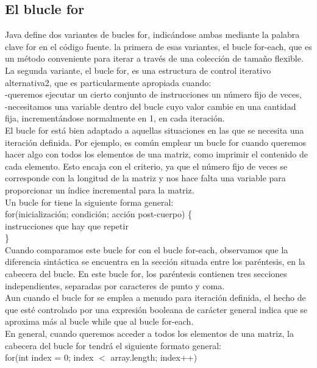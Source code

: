 \documentclass[11pt,a4paper]{article}
\begin{document}
\subsection{El blucle for}
Java define dos variantes de bucles for, indicándose ambas mediante la palabra clave for en el
código fuente.
la primera de esas variantes, el bucle for-each,
que es un método conveniente para iterar a través de una colección de tamaño flexible. La segunda
variante, el bucle for, es una estructura de control iterativo alternativa2, que es particularmente
apropiada cuando:\\
-queremos ejecutar un cierto conjunto de instrucciones un número fijo de veces,\\
-necesitamos una variable dentro del bucle cuyo valor cambie en una cantidad fija, incrementándose
normalmente en 1, en cada iteración.\\
El bucle for está bien adaptado a aquellas situaciones en las que se necesita una iteración definida.
Por ejemplo, es común emplear un bucle for cuando queremos hacer algo con todos los elementos
de una matriz, como imprimir el contenido de cada elemento. Esto encaja con el criterio, ya que el
número fijo de veces se corresponde con la longitud de la matriz y nos hace falta una variable para
proporcionar un índice incremental para la matriz.\\
Un bucle for tiene la siguiente forma general:\\
for(inicialización; condición; acción post-cuerpo) \{ \\
	instrucciones que hay que repetir\\
\}\\
Cuando comparamos este bucle for con el bucle for-each, observamos que la diferencia sintáctica
se encuentra en la sección situada entre los paréntesis, en la cabecera del bucle. En este bucle for,
los paréntesis contienen tres secciones independientes, separadas por caracteres de punto y coma.\\
Aun cuando el bucle for se emplea a menudo para iteración definida, el hecho de que esté controlado
por una expresión booleana de carácter general indica que se aproxima más al bucle while que
al bucle for-each.\\
En general, cuando queremos acceder a todos los elementos de una matriz,
la cabecera del bucle for tendrá el siguiente formato general:\\
for(int index = 0; index $<$ array.length; index++)\\
\\
\end{document}
